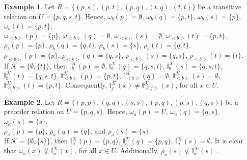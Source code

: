 \documentclass{article}
\theoremstyle{theorem}
\theoremstyle{definition}
\newtheorem{example}{Example}[section]
\theoremstyle{remark}
\begin{document}
\begin{example}\label{e4}Let $R = \{(p, s), (p, t), (p, q), (t, q), (t, t)\}$ be a transitive relation on $U=\{p, q, s, t\}$. Hence,
$\omega_{b}(p)=\emptyset$, $\omega_{b}(q)=\{p, t\}$, $\omega_{b}(s)=\{p\}$, $\omega_{b}(t)=\{p, t\}$,\\
 $\omega_{<b>}(p)=\{p\}$, $\omega_{<b>}(q)=\emptyset$, $\omega_{<b>}(s)=\emptyset$, $\omega_{<b>}(t)=\{p, t\}$, \\
 $\rho_{b}(p)=\{p\}$, $\rho_{b}(q)=\{q, t\}$, $\rho_{b}(s)=\{s\}$, $\rho_{b}(t)=\{q, t\}$,\\
 $\rho_{<b>}(p)=\{p\}$, $\rho_{<b>}(q)=\{q, s\}$, $\rho_{<b>}(s)=\{q, s\}$, $\rho_{<b>}(t)=\{t\}$.\\
 If $\mathcal{K}=\{\emptyset, \{t\}\}$, then
$\mathbb{I}^{\mathcal{K}}_{b}(p)=\emptyset$, $\mathbb{I}^{\mathcal{K}}_{b}(q)=\{q, s, t\}$, $\mathbb{I}^{\mathcal{K}}_{b}(s)=\{q, s, t\}$, $\mathbb{I}^{\mathcal{K}}_{b}(t)=\{q, s, t\}$,
$\mathbb{I}^{\mathcal{K}}_{<b>}(p)=\{p, t\}$, $\mathbb{I}^{\mathcal{K}}_{<b>}(q)=\emptyset$, $\mathbb{I}^{\mathcal{K}}_{<b>}(s)=\emptyset$, $\mathbb{I}^{\mathcal{K}}_{<b>}(t)=\{p, t\}$. Consequently, $\mathbb{I}^{\mathcal{K}}_{j}(x) \neq \mathbb{I}^{\mathcal{K}}_{<j>}(x)$, for all $x\in U$.\color{black}
\end{example}

\begin{example}\label{e5} Let $R = \{(p, p), (q, q), (s, s), (p, q), (p, s), (q, s)\}$ be a preorder relation on $U=\{p, q, s \}$. Hence,
$\omega_{a}(p)= U$, $\omega_{a}(q)=\{q, s\}$, $\omega_{a}(s)=\{s\}$, \\
 $\rho_{a}(p)= \{p\}$, $\rho_{a}(q)= \{q\}$, and $\rho_{a}(s)=\{s\}$.\\
If $\mathcal{K}=\{\emptyset, \{s\}\}$, then \color{black} $\mathbb{I}^{\mathcal{K}}_{a}(p)=\{p, q\}$, $\mathbb{I}^{\mathcal{K}}_{a}(q)=\{p, q\}$, $\mathbb{I}^{\mathcal{K}}_{a}(s)=\emptyset$. It is clear that $\omega_{a}(x) \nsubseteq \mathbb{I}^{\mathcal{K}}_{a}(x)$, for all $x\in U$. Additionally, $\rho_{a}(s) \nsubseteq \mathbb{I}^{\mathcal{K}}_{a}(s)$ \color{black}.
\end{example}
\end{document}
